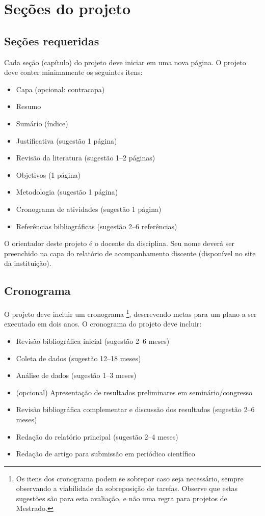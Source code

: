 \documentclass[a4paper]{article}
\begin{document}
\section{Seções do projeto}

\subsection{Seções requeridas}

Cada seção (capítulo) do projeto deve iniciar em uma nova página. O projeto deve
conter minimamente os seguintes itens:

\begin{itemize}
\item Capa (opcional: contracapa)
\item Resumo
\item Sumário (índice)
\item Justificativa (sugestão 1 página)
\item Revisão da literatura (sugestão 1--2 páginas)
\item Objetivos (1 página)
\item Metodologia (sugestão 1 página)
\item Cronograma de atividades (sugestão 1 página)
\item Referências bibliográficas (sugestão 2--6 referências)
\end{itemize}

O orientador deste projeto é o docente da disciplina. Seu nome deverá ser
preenchido na capa do relatório de acompanhamento discente (disponível
no site da instituição).

\subsection{Cronograma}

O projeto deve incluir um cronograma \footnote{Os itens dos cronograma
  podem se sobrepor caso seja necessário, sempre observando a
  viabilidade da sobreposição de tarefas. Observe que estas sugestões
  são para esta avaliação, e não uma regra para projetos de
  Mestrado.}, descrevendo metas para um plano a ser executado em dois
anos. O cronograma do projeto deve incluir:

\begin{itemize}
\item Revisão bibliográfica inicial (sugestão 2--6 meses)
\item Coleta de dados (sugestão 12--18 meses)
\item Análise de dados (sugestão 1--3 meses)
\item (opcional) Apresentação de resultados preliminares em
  seminário/congresso
\item Revisão bibliográfica complementar e discussão dos resultados
  (sugestão 2--6 meses)
\item Redação do relatório principal (sugestão 2--4 meses)
\item Redação de artigo para submissão em periódico científico
\end{itemize}



\end{document}
